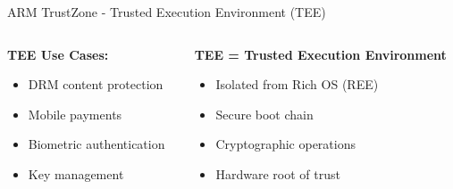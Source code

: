 \documentclass[aspectratio=169,12pt]{beamer}
\begin{document}
\begin{frame}{ARM TrustZone - Trusted Execution Environment (TEE)}
\begin{center}
    \end{center}
    
    \begin{columns}
        \begin{column}{0.5\textwidth}
            \textbf{TEE Use Cases:}
            \begin{itemize}
                \item DRM content protection
                \item Mobile payments
                \item Biometric authentication
                \item Key management
            \end{itemize}
        \end{column}
        \begin{column}{0.5\textwidth}
            \textbf{TEE = Trusted Execution Environment}
            \begin{itemize}
                \item Isolated from Rich OS (REE)
                \item Secure boot chain
                \item Cryptographic operations
                \item Hardware root of trust
            \end{itemize}
        \end{column}
    \end{columns}
\end{frame}
\end{document}

